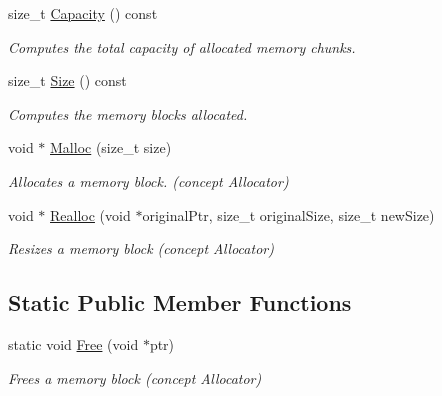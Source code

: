 \begin{DoxyCompactItemize}
size\+\_\+t \hyperlink{a01984_a5672e0833fda2e71ce987911397489ed}{Capacity} () const
\begin{DoxyCompactList}\small\item\em Computes the total capacity of allocated memory chunks. \end{DoxyCompactList}\item 
size\+\_\+t \hyperlink{a01984_ae7fcf0341c13e899cf488bc7c8949956}{Size} () const
\begin{DoxyCompactList}\small\item\em Computes the memory blocks allocated. \end{DoxyCompactList}\item 
\mbox{\label{a01984_a02f6832910453446cb77bf919ba49e99}} 
void $\ast$ \hyperlink{a01984_a02f6832910453446cb77bf919ba49e99}{Malloc} (size\+\_\+t size)
\begin{DoxyCompactList}\small\item\em Allocates a memory block. (concept Allocator) \end{DoxyCompactList}\item 
\mbox{\label{a01984_aba75280d42184b0ad414243f7f5ac6c7}} 
void $\ast$ \hyperlink{a01984_aba75280d42184b0ad414243f7f5ac6c7}{Realloc} (void $\ast$original\+Ptr, size\+\_\+t original\+Size, size\+\_\+t new\+Size)
\begin{DoxyCompactList}\small\item\em Resizes a memory block (concept Allocator) \end{DoxyCompactList}\end{DoxyCompactItemize}
\subsection*{Static Public Member Functions}
\begin{DoxyCompactItemize}
\item 
\mbox{\label{a01984_a6b180eb150451b4df8b70d827cd1191c}} 
static void \hyperlink{a01984_a6b180eb150451b4df8b70d827cd1191c}{Free} (void $\ast$ptr)
\begin{DoxyCompactList}\small\item\em Frees a memory block (concept Allocator) \end{DoxyCompactList}\end{DoxyCompactItemize}
